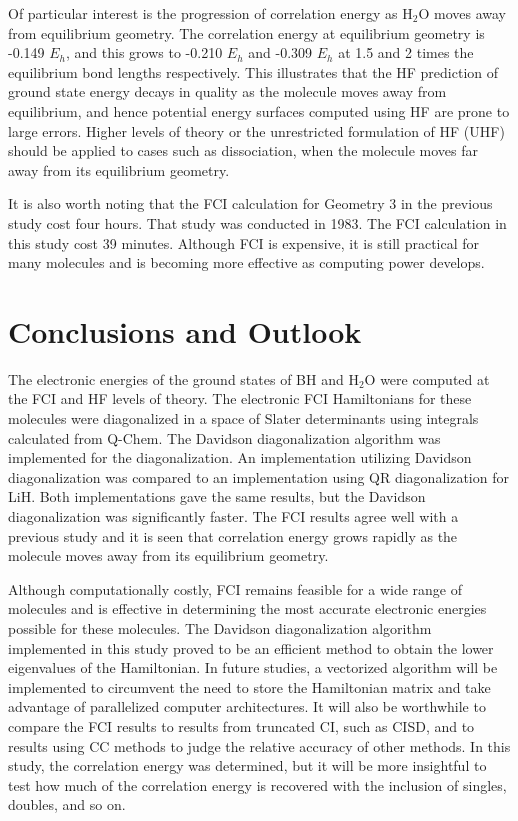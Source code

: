 \documentclass[final,3p,times,twocolumn]{elsarticle}
\begin{document}
Of particular interest is the progression of correlation energy as H$_2$O moves away from equilibrium geometry. The correlation energy at equilibrium geometry is -0.149 $E_h$, and this grows to -0.210 $E_h$ and -0.309 $E_h$ at 1.5 and 2 times the equilibrium bond lengths respectively. This illustrates that the HF prediction of ground state energy decays in quality as the molecule moves away from equilibrium, and hence potential energy surfaces computed using HF are prone to large errors. Higher levels of theory or the unrestricted formulation of HF (UHF) should be applied to cases such as dissociation, when the molecule moves far away from its equilibrium geometry.

It is also worth noting that the FCI calculation for Geometry 3 in the previous study cost four hours.\cite{handy-1983} That study was conducted in 1983. The FCI calculation in this study cost 39 minutes. Although FCI is expensive, it is still practical for many molecules and is becoming more effective as computing power develops.


\section{Conclusions and Outlook}
\label{sect:Concl}
The electronic energies of the ground states of BH and H$_2$O were computed at the FCI and HF levels of theory. The electronic FCI Hamiltonians for these molecules were diagonalized in a space of Slater determinants using integrals calculated from Q-Chem. The Davidson diagonalization algorithm was implemented for the diagonalization. An implementation utilizing Davidson diagonalization was compared to an implementation using QR diagonalization for LiH. Both implementations gave the same results, but the Davidson diagonalization was significantly faster. The FCI results agree well with a previous study\cite{handy-1983} and it is seen that correlation energy grows rapidly as the molecule moves away from its equilibrium geometry.

Although computationally costly, FCI remains feasible for a wide range of molecules and is effective in determining the most accurate electronic energies possible for these molecules. The Davidson diagonalization algorithm implemented in this study proved to be an efficient method to obtain the lower eigenvalues of the Hamiltonian. In future studies, a vectorized algorithm will be implemented to circumvent the need to store the Hamiltonian matrix and take advantage of parallelized computer architectures.\cite{handy-1983} It will also be worthwhile to compare the FCI results to results from truncated CI, such as CISD, and to results using CC methods to judge the relative accuracy of other methods. In this study, the correlation energy was determined, but it will be more insightful to test how much of the correlation energy is recovered with the inclusion of singles, doubles, and so on.
\end{document}
